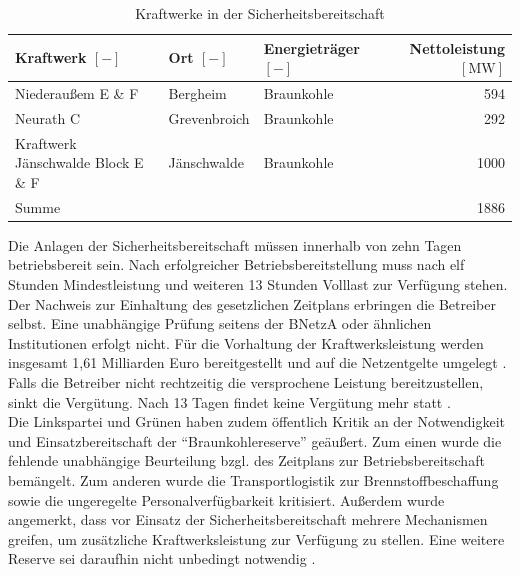 			\begin{table}[H]
				\centering
				\caption{Kraftwerke in der Sicherheitsbereitschaft \cite{Excel_Kraftwerksliste}}
				\label{Tab. Kraftwerke Sicherheitsbereitschaft}
				\begin{tabular}{lllr}
					\hline
					\makecell[c]{Kraftwerk \\ $\left[-\right]$} & \makecell[c]{Ort \\ $\left[-\right]$} & \makecell[c]{Energieträger \\ $\left[-\right]$} & \makecell[c]{Nettoleistung \\ $\left[\si{\mega\watt}\right]$} \\ \hline 
					Niederaußem E \& F & Bergheim & Braunkohle & \num{594} \\
					Neurath C & Grevenbroich & Braunkohle & \num{292} \\
					Kraftwerk Jänschwalde Block E \& F & Jänschwalde & Braunkohle & \num{1000} \\ \hline
					Summe &  &  & \num{1886} \\ \hline
				\end{tabular}
			\end{table}
		
			Die Anlagen der Sicherheitsbereitschaft müssen innerhalb von zehn Tagen betriebsbereit sein.
			Nach erfolgreicher Betriebsbereitstellung muss nach elf Stunden Mindestleistung und weiteren 13 Stunden Volllast zur Verfügung stehen.
			Der Nachweis zur Einhaltung des gesetzlichen Zeitplans erbringen die Betreiber selbst.
			Eine unabhängige Prüfung seitens der BNetzA oder ähnlichen Institutionen erfolgt nicht.  
			Für die Vorhaltung der Kraftwerksleistung werden insgesamt 1,61 Milliarden Euro bereitgestellt und auf die Netzentgelte umgelegt \cite{Netz_Kapa_Reserve_NextKraftwerke}.
			Falls die Betreiber nicht rechtzeitig die versprochene Leistung bereitzustellen, sinkt die Vergütung.
			Nach 13 Tagen findet keine Vergütung mehr statt \cite{EnWG}. \\
			
			Die Linkspartei und Grünen haben zudem öffentlich Kritik an der Notwendigkeit und Einsatzbereitschaft der "`Braunkohlereserve"' geäußert.
			Zum einen wurde die fehlende unabhängige Beurteilung bzgl. des Zeitplans zur Betriebsbereitschaft bemängelt.
			Zum anderen wurde die Transportlogistik zur Brennstoffbeschaffung sowie die ungeregelte Personalverfügbarkeit kritisiert.
			Außerdem wurde angemerkt, dass vor Einsatz der Sicherheitsbereitschaft mehrere Mechanismen greifen, um zusätzliche Kraftwerksleistung zur Verfügung zu stellen.
			Eine weitere Reserve sei daraufhin nicht unbedingt notwendig \cite{Netz_Kapa_Reserve_NextKraftwerke}.
			
